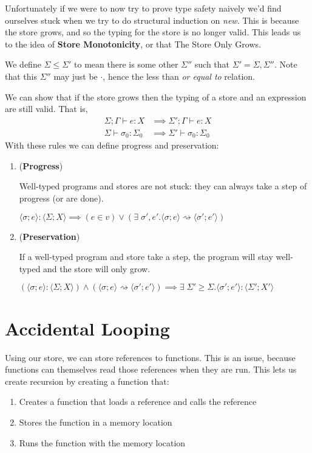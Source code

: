 \documentclass{article}
\begin{document}
Unfortunately if we were to now try to prove type safety naively we'd find ourselves stuck when we try to do structural induction on \textit{new}. This is because the store grows, and so the typing for the store is no longer valid. This leads us to the idea of \textbf{Store Monotonicity}, or that The Store Only Grows.

We define $\Sigma \leq \Sigma'$ to mean there is some other $\Sigma''$ such that $\Sigma' = \Sigma, \Sigma''$. Note that this $\Sigma''$ may just be $\cdot$, hence the less than \textit{or equal to} relation.

We can show that if the store grows then the typing of a store and an expression are still valid. That is,
\begin{equation*}
\begin{split}
    \Sigma ; \Gamma \vdash e : X &\implies \Sigma' ; \Gamma \vdash e : X\\
    \Sigma \vdash \sigma_0 : \Sigma_0 &\implies \Sigma' \vdash \sigma_0 : \Sigma_0
\end{split}
\end{equation*}
With these rules we can define progress and preservation:

\begin{enumerate}
\item  (\textbf{Progress})

Well-typed programs and stores are not stuck: they can always take a step of progress (or are done).

$\langle \sigma; e\rangle : \langle \Sigma; X\rangle \implies (e \in v) \lor (\exists \; \sigma', e'. \langle \sigma; e\rangle \rightsquigarrow \langle \sigma'; e'\rangle)$

\item  (\textbf{Preservation})

If a well-typed program and store take a step, the program will stay well-typed and the store will only grow.

$(\langle \sigma ; e \rangle : \langle \Sigma ; X \rangle) \land (\langle \sigma ; e \rangle \rightsquigarrow \langle \sigma' ; e' \rangle) \implies \exists \; \Sigma' \geq \Sigma.\langle \sigma' ; e' \rangle : \langle \Sigma';X'\rangle$
\end{enumerate}

\newpage
\section{Accidental Looping}

Using our store, we can store references to functions. This is an issue, because functions can themselves read those references when they are run. This lets us create recursion by creating a function that:
\begin{enumerate}
    \item Creates a function that loads a reference and calls the reference
    \item Stores the function in a memory location
    \item Runs the function with the memory location
\end{enumerate}
\end{document}
